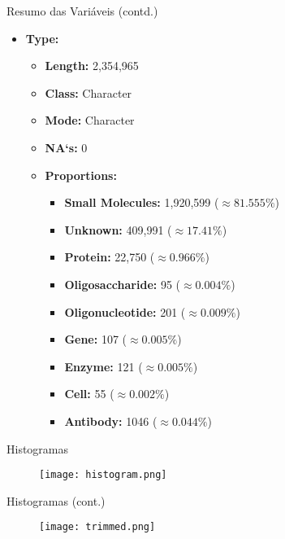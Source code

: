 \documentclass[8pt]{beamer}
\begin{document}
\begin{frame}{Resumo das Variáveis (contd.)}
  \begin{itemize}
    \item \textbf{Type:}
    \begin{itemize}
        \item \textbf{Length:} 2,354,965
        \item \textbf{Class:} Character
        \item \textbf{Mode:} Character
        \item \textbf{NA`s:} 0
        \item \textbf{Proportions:}
        \begin{multicols}{2}
            \begin{itemize}
                \item \textbf{Small Molecules:} 1,920,599 ($\approx 81.555\% $)
                \item \textbf{Unknown:} 409,991 ($\approx 17.41\% $)
                \item \textbf{Protein:} 22,750 ($\approx 0.966\% $)
                \item \textbf{Oligosaccharide:} 95 ($\approx 0.004\% $)
                \item \textbf{Oligonucleotide:} 201 ($\approx 0.009\% $)
                \item \textbf{Gene:} 107 ($\approx 0.005\% $)
                \item \textbf{Enzyme:} 121 ($\approx 0.005\% $)
                \item \textbf{Cell:} 55 ($\approx 0.002\% $)
                \item \textbf{Antibody:} 1046 ($\approx 0.044\% $)
            \end{itemize}
         \end{multicols}
     \end{itemize}
  \end{itemize}
\end{frame}


\begin{frame}{Histogramas}
\begin{figure}[h]
  \centering
  \texttt{[image: histogram.png]}
\end{figure}
\end{frame}

\begin{frame}{Histogramas (cont.)}
\begin{figure}[h]
  \centering
  \texttt{[image: trimmed.png]}
\end{figure}
\end{frame}
\end{document}
